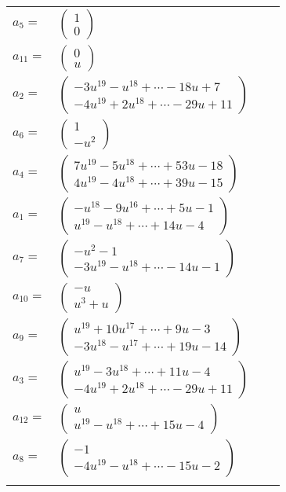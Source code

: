 \documentclass[1p]{elsarticle_modified}
\theoremstyle{definition}
\begin{document}
\begin{tabular}{m{7pt} m{180pt} m{7pt} m{180pt} }
\flushright $a_{5}=$&$\begin{pmatrix}1\\0\end{pmatrix}$ \\
\flushright $a_{11}=$&$\begin{pmatrix}0\\u\end{pmatrix}$ \\
\flushright $a_{2}=$&$\begin{pmatrix}-3 u^{19}- u^{18}+\cdots-18 u+7\\-4 u^{19}+2 u^{18}+\cdots-29 u+11\end{pmatrix}$ \\
\flushright $a_{6}=$&$\begin{pmatrix}1\\- u^2\end{pmatrix}$ \\
\flushright $a_{4}=$&$\begin{pmatrix}7 u^{19}-5 u^{18}+\cdots+53 u-18\\4 u^{19}-4 u^{18}+\cdots+39 u-15\end{pmatrix}$ \\
\flushright $a_{1}=$&$\begin{pmatrix}- u^{18}-9 u^{16}+\cdots+5 u-1\\u^{19}- u^{18}+\cdots+14 u-4\end{pmatrix}$ \\
\flushright $a_{7}=$&$\begin{pmatrix}- u^2-1\\-3 u^{19}- u^{18}+\cdots-14 u-1\end{pmatrix}$ \\
\flushright $a_{10}=$&$\begin{pmatrix}- u\\u^3+u\end{pmatrix}$ \\
\flushright $a_{9}=$&$\begin{pmatrix}u^{19}+10 u^{17}+\cdots+9 u-3\\-3 u^{18}- u^{17}+\cdots+19 u-14\end{pmatrix}$ \\
\flushright $a_{3}=$&$\begin{pmatrix}u^{19}-3 u^{18}+\cdots+11 u-4\\-4 u^{19}+2 u^{18}+\cdots-29 u+11\end{pmatrix}$ \\
\flushright $a_{12}=$&$\begin{pmatrix}u\\u^{19}- u^{18}+\cdots+15 u-4\end{pmatrix}$ \\
\flushright $a_{8}=$&$\begin{pmatrix}-1\\-4 u^{19}- u^{18}+\cdots-15 u-2\end{pmatrix}$\\&\end{tabular}
\end{document}
